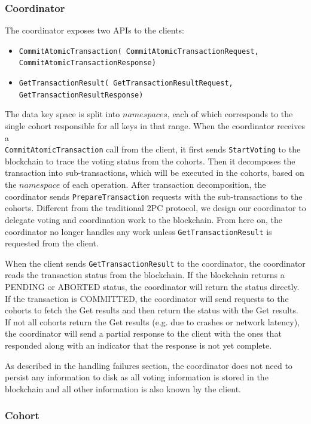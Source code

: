 \documentclass[11pt,conference]{IEEEtran}
\begin{document}
\subsubsection{Coordinator} \label{coordinator}
The coordinator exposes two APIs to the clients:
\begin{itemize}
  \item \texttt{CommitAtomicTransaction(
    CommitAtomicTransactionRequest, CommitAtomicTransactionResponse)}
  \item \texttt{GetTransactionResult(
    GetTransactionResultRequest, GetTransactionResultResponse)}
\end{itemize}   

The data key space is split into $namespaces$, each of which corresponds to the single cohort responsible for all keys in that range.  When the coordinator receives a \texttt{\\CommitAtomicTransaction} call from the client, it first sends \texttt{StartVoting} to the blockchain to trace the voting status from the cohorts. Then it decomposes the transaction into sub-transactions, which will be executed in the cohorts, based on the $namespace$ of each operation. After transaction decomposition, the coordinator sends \texttt{PrepareTransaction} requests with the sub-transactions to the cohorts. Different from the traditional 2PC protocol, we design our coordinator to delegate voting and coordination work to the blockchain. From here on, the coordinator no longer handles any work unless \texttt{GetTransactionResult} is requested from the client.

When the client sends \texttt{GetTransactionResult} to the coordinator, the coordinator reads the transaction status from the blockchain. If the blockchain returns a PENDING or ABORTED status, the coordinator will return the status directly. If the transaction is COMMITTED, the coordinator will send requests to the cohorts to fetch the Get results and then return the status with the Get results. If not all cohorts return the Get results (e.g. due to crashes or network latency), the coordinator will send a partial response to the client with the ones that responded along with an indicator that the response is not yet complete.

As described in the handling failures section, the coordinator does not need to persist any information to disk as all voting information is stored in the blockchain and all other information is also known by the client.

\subsubsection{Cohort} \label{cohort}
\end{document}
